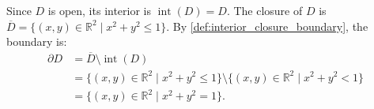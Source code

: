\begin{exercisesolution}
Since $D$ is open, its interior is $\operatorname{int}(D) = D$. The closure of $D$ is $\overline{D} = \{(x,y) \in \mathbb{R}^2 \mid x^2 + y^2 \leq 1\}$. By \cref{def:interior_closure_boundary}, the boundary is:
\begin{align*}
\partial D &= \overline{D} \setminus \operatorname{int}(D) \\
&= \{(x,y) \in \mathbb{R}^2 \mid x^2 + y^2 \leq 1\} \setminus \{(x,y) \in \mathbb{R}^2 \mid x^2 + y^2 < 1\} \\
&= \{(x,y) \in \mathbb{R}^2 \mid x^2 + y^2 = 1\}.
\end{align*}
\end{exercisesolution}


